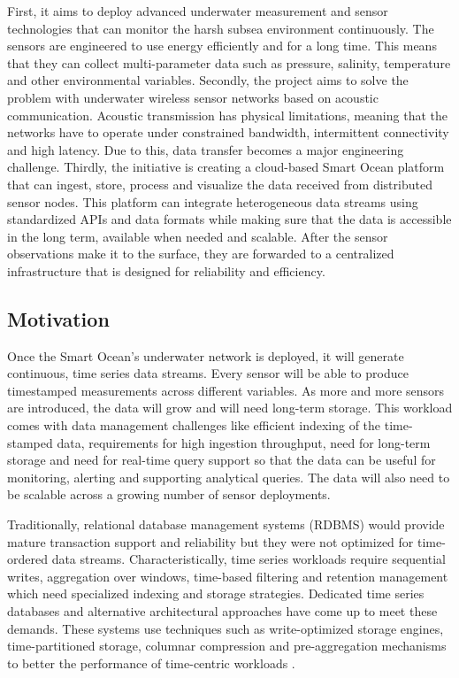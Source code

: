 First, it aims to deploy advanced underwater measurement and sensor technologies that can monitor the harsh subsea environment continuously. The sensors are engineered to use energy efficiently and for a long time. This means that they can collect multi-parameter data such as pressure, salinity, temperature and other environmental variables. Secondly, the project aims to solve the problem with underwater wireless sensor networks based on acoustic communication. Acoustic transmission has physical limitations, meaning that the networks have to operate under constrained bandwidth, intermittent connectivity and high latency. Due to this, data transfer becomes a major engineering challenge. Thirdly, the initiative is creating a cloud-based Smart Ocean platform that can ingest, store, process and visualize the data received from distributed sensor nodes. This platform can integrate heterogeneous data streams using standardized APIs and data formats while making sure that the data is accessible in the long term, available when needed and scalable. After the sensor observations make it to the surface, they are forwarded to a centralized infrastructure that is designed for reliability and efficiency. 



\subsection{Motivation}
Once the Smart Ocean’s underwater network is deployed, it will generate continuous, time series data streams. Every sensor will be able to produce timestamped measurements across different variables. As more and more sensors are introduced, the data will grow and will need long-term storage. This workload comes with data management challenges like efficient indexing of the time-stamped data, requirements for high ingestion throughput, need for long-term storage and need for real-time query support so that the data can be useful for monitoring, alerting and supporting analytical queries. The data will also need to be scalable across a growing number of sensor deployments.

Traditionally, relational database management systems (RDBMS) would provide mature transaction support and reliability but they were not optimized for time-ordered data streams. Characteristically, time series workloads require sequential writes, aggregation over windows, time-based filtering and retention management which need specialized indexing and storage strategies. Dedicated time series databases and alternative architectural approaches have come up to meet these demands. These systems use techniques such as write-optimized storage engines, time-partitioned storage, columnar compression and pre-aggregation mechanisms to better the performance of time-centric workloads \cite{Jensen2017}. 

